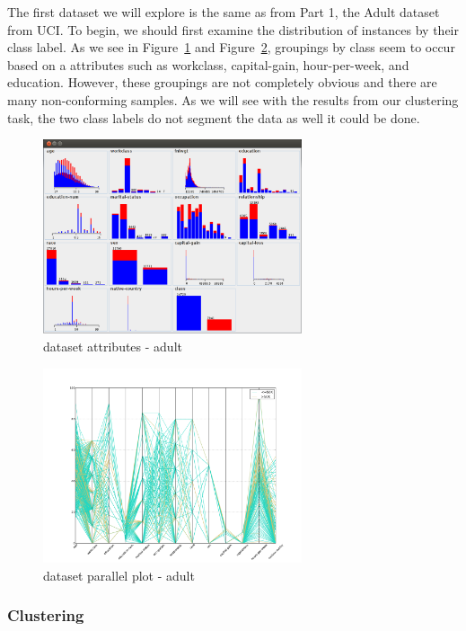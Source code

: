 \documentclass{sig-alternate}
\begin{document}
The first dataset we will explore is the same as from Part 1, the Adult dataset from UCI. To begin, we should first examine the distribution of instances by their class label. As we see in Figure~\ref{adult-attr-class} and Figure~\ref{adult-parallel-class}, groupings by class seem to occur based on a attributes such as workclass, capital-gain, hour-per-week, and education. However, these groupings are not completely obvious and there are many non-conforming samples. As we will see with the results from our clustering task, the two class labels do not segment the data as well it could be done.

\begin{figure}[!htbp]
    \centering
    \includegraphics[width=3in]{part2/adult/attr-class.pdf}
    \caption{dataset attributes - adult\label{adult-attr-class}}
\end{figure} 

\begin{figure}[!htbp]
    \centering
    \includegraphics[width=3in]{part2/adult/parallel-class.pdf}
    \caption{dataset parallel plot - adult\label{adult-parallel-class}}
\end{figure} 

\subsubsection{Clustering}
\end{document}
